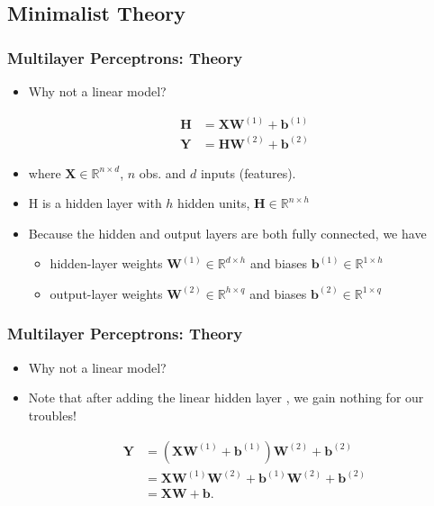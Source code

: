 \documentclass[
  shownotes,
  xcolor={svgnames},
  hyperref={colorlinks,citecolor=DarkBlue,linkcolor=DarkRed,urlcolor=DarkBlue}
  , aspectratio=169]{beamer}
\begin{document}
\subsection{Minimalist Theory}
\begin{frame}
\frametitle{Multilayer Perceptrons: Theory}

\begin{itemize}
 \item Why not a linear model? 


\begin{align} 
 \mathbf{H} & = \mathbf{X} \mathbf{W}^{(1)} + \mathbf{b}^{(1)} \\ \nonumber
 \mathbf{Y} & = \mathbf{H}\mathbf{W}^{(2)} + \mathbf{b}^{(2)}  \nonumber
  \end{align} 
\bigskip
\item  where $\mathbf{X} \in \mathbb{R}^{n \times d}$,  $n$ obs. and $d$ inputs (features). 
\item H is a hidden layer with $h$ hidden units, $\mathbf{H} \in \mathbb{R}^{n \times h}$

\item  Because the hidden and output layers are both fully connected, we have 
\begin{itemize}
 \item hidden-layer weights $\mathbf{W}^{(1)} \in \mathbb{R}^{d \times h}$ and biases $\mathbf{b}^{(1)} \in \mathbb{R}^{1 \times h}$  
\item output-layer weights $\mathbf{W}^{(2)} \in \mathbb{R}^{h \times q}$ and biases $\mathbf{b}^{(2)} \in \mathbb{R}^{1 \times q}$
\end{itemize}

\end{itemize}

\end{frame}
\begin{frame}
\frametitle{Multilayer Perceptrons: Theory}

\begin{itemize}
 \item Why not a linear model?
\medskip
\item Note that after adding the linear hidden layer , we gain nothing for our troubles! 
\medskip


\begin{align}
\mathbf{Y} &= (\mathbf{X} \mathbf{W}^{(1)} + \mathbf{b}^{(1)})\mathbf{W}^{(2)} + \mathbf{b}^{(2)} \\ \nonumber
&= \mathbf{X} \mathbf{W}^{(1)}\mathbf{W}^{(2)} + \mathbf{b}^{(1)} \mathbf{W}^{(2)} + \mathbf{b}^{(2)} \\ \nonumber
&= \mathbf{X} \mathbf{W} + \mathbf{b}. \nonumber
\end{align} 
\end{itemize}

\end{frame}
\end{document}
